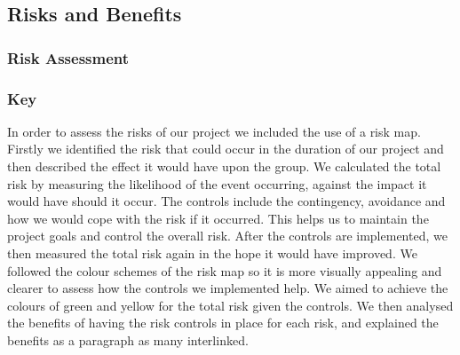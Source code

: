 	\subsection*{Risks and Benefits}
		\subsubsection*{Risk Assessment}
			
			
			
			
			\subsubsection*{Key}
            
            In order to assess the risks of our project we included the use of a risk map. Firstly we identified the risk that could occur in the duration of our project and then described the effect it would have upon the group. We calculated the total risk by measuring the likelihood of the event occurring, against the impact it would have should it occur. The controls include the contingency, avoidance and how we would cope with the risk if it occurred. This helps us to maintain the project goals and control the overall risk. After the controls are implemented, we then measured the total risk again in the hope it would have improved. We followed the colour schemes of the risk map so it is more visually appealing and clearer to assess how the controls we implemented help. We aimed to achieve the colours of green and yellow for the total risk given the controls. We then analysed the benefits of having the risk controls in place for each risk, and explained the benefits as a paragraph as many interlinked.

